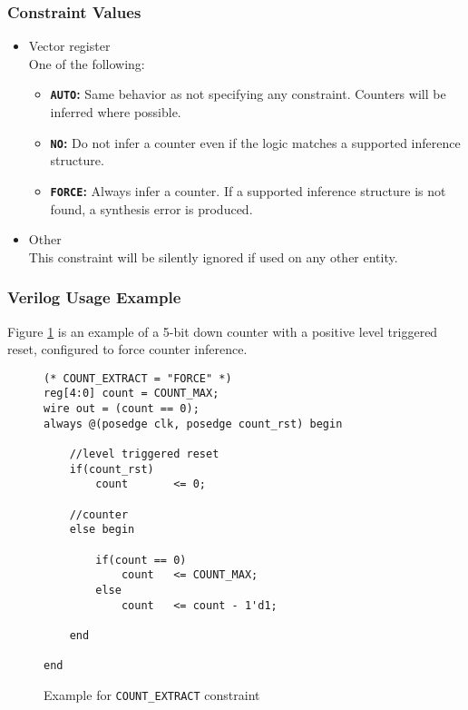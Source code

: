 \documentclass[11pt]{article}
\newcommand{\tokenstyle}[1]{\texttt{#1}}
\newcommand{\valuestyle}[1]{\texttt{#1}}
\newcommand{\strvaluestyle}[1]{\valuestyle{\textquotedbl#1\textquotedbl}}
\newcommand{\strexamplestyle}[1]{\textbf{\strvaluestyle{#1}:}}
\newcommand{\whenstyle}[1]{{\fontseries{sb}\selectfont#1}}
\begin{document}
\subsubsection{Constraint Values}
\begin{itemize}
\item \whenstyle{Vector register}\\
One of the following:
\begin{itemize}
\item \strexamplestyle{AUTO} Same behavior as not specifying any constraint. Counters will be inferred where possible.
\item \strexamplestyle{NO} Do not infer a counter even if the logic matches a supported inference structure.
\item \strexamplestyle{FORCE} Always infer a counter. If a supported inference structure is not found, a synthesis error is produced.
\end{itemize}
\item \whenstyle{Other} \\
This constraint will be silently ignored if used on any other entity.
\end{itemize}

\subsubsection{Verilog Usage Example}

Figure \ref{constraint-count-extract} is an example of a 5-bit down counter with a positive level triggered reset,
configured to force counter inference.

\begin{figure}[h]
\begin{lstlisting}
(* COUNT_EXTRACT = "FORCE" *)
reg[4:0] count = COUNT_MAX;
wire out = (count == 0);
always @(posedge clk, posedge count_rst) begin

	//level triggered reset
	if(count_rst)
		count		<= 0;

	//counter
	else begin

		if(count == 0)
			count	<= COUNT_MAX;
		else
			count	<= count - 1'd1;

	end

end
\end{lstlisting}
\caption{Example for \tokenstyle{COUNT\_EXTRACT} constraint}
\label{constraint-count-extract}
\end{figure}

\end{document}
